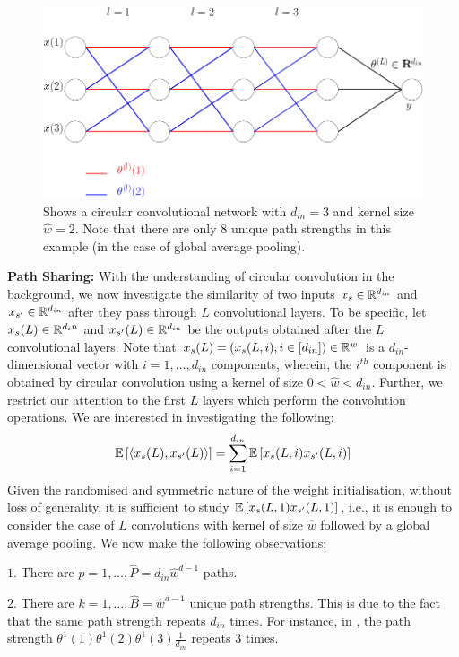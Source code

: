 \begin{figure}
\centering
\includegraphics[scale=0.25]{figs/circconv.png}
\caption{Shows a circular convolutional network with $d_{in}=3$ and kernel size $\hat{w}=2$. Note that there are only $8$ unique path strengths in this example (in the case of global average pooling).}
\label{fig:circconv}
\end{figure}



\textbf{Path Sharing:} With the understanding of circular convolution in the background, we now investigate the similarity of two inputs $x_s\in \mathbb{R}^{d_{in}}$ and $x_{s'}\in \mathbb{R}^{d_{in}}$ after they pass through $L$ convolutional layers. To be specific, let $x_s(L)\in \mathbb{R}^{d_in}$ and $x_{s'}(L)\in \mathbb{R}^{d_{in}}$ be the outputs obtained after the $L$ convolutional layers. Note that $x_s(L)=(x_s(L,i),i\in[d_{in}])\in \mathbb{R}^w$ is a $d_{in}$-dimensional vector with $i=1,\ldots,d_{in}$ components, wherein, the $i^{th}$ component is obtained by circular convolution using a kernel of size $0<\hat{w}<d_{in}$. Further, we restrict our attention to the first $L$ layers which perform the convolution operations. We are interested in investigating the following: 
\begin{align}
\mathbb{E}\left[\langle x_s(L),x_{s'}(L) \rangle\right]=\sum_{i=1}^{d_{in}} \mathbb{E}\left[x_s(L,i)x_{s'}(L,i)\right]
\end{align}
Given the randomised and symmetric nature of the weight initialisation, without loss of generality, it is sufficient to study $\mathbb{E}\left[x_s(L,1)x_{s'}(L,1)\right]$, i.e., it is enough to consider the case of $L$ convolutions with kernel of size $\hat{w}$ followed by a global average pooling. We now make the following observations:

$1.$ There are $p=1,\ldots,\hat{P}=d_{in}\hat{w}^{d-1}$ paths.

$2.$ There are $k=1,\ldots,\hat{B}=\hat{w}^{d-1}$ unique path strengths. This is due to the fact that the same path strength repeats $d_{in}$ times. For instance, in , the path strength $\theta^{1}(1)\theta^{1}(2)\theta^{1}(3)\frac{1}{d_{in}}$ repeats $3$ times.

